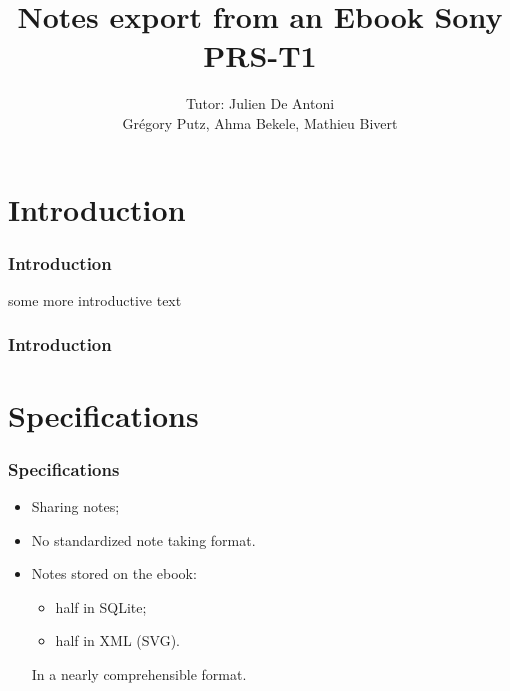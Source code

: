 \documentclass[t,12pt]{beamer}
\title{Notes export from an Ebook Sony PRS-T1}
\author{Tutor: Julien De Antoni\\Grégory Putz, Ahma Bekele, Mathieu Bivert}
\date{\oldstylenums{June 2012}}
\begin{document}
\frame{\titlepage}

\section{Introduction}

\begin{frame}
  \frametitle{Introduction}
  some more introductive text
\end{frame}

\begin{frame}
  \frametitle{Introduction}
  \centering
  \tableofcontents
\end{frame}



\section{Specifications}
\begin{frame}
  \frametitle{Specifications}
  \begin{itemize}
  \pause \item Sharing notes;
  \pause \item No standardized note taking format.
  \pause \item Notes stored on the ebook:
    \begin{itemize}
      \item half in SQLite;
      \item half in XML (SVG).
    \end{itemize}
  \pause In a nearly comprehensible format.
  \end{itemize}
\end{frame}
\end{document}
